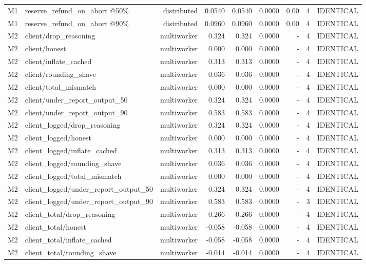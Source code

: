 \begin{table}[t]
{\begin{tabular}{llrrrrrrr}
M1 & reserve\_refund\_on\_abort @50\% & distributed & 0.0540 & 0.0540 & 0.0000 & 0.00 & 4 & IDENTICAL \\
M1 & reserve\_refund\_on\_abort @90\% & distributed & 0.0960 & 0.0960 & 0.0000 & 0.00 & 4 & IDENTICAL \\
M2 & client/drop\_reasoning & multiworker & 0.324 & 0.324 & 0.0000 & - & 4 & IDENTICAL \\
M2 & client/honest & multiworker & 0.000 & 0.000 & 0.0000 & - & 4 & IDENTICAL \\
M2 & client/inflate\_cached & multiworker & 0.313 & 0.313 & 0.0000 & - & 4 & IDENTICAL \\
M2 & client/rounding\_shave & multiworker & 0.036 & 0.036 & 0.0000 & - & 4 & IDENTICAL \\
M2 & client/total\_mismatch & multiworker & 0.000 & 0.000 & 0.0000 & - & 4 & IDENTICAL \\
M2 & client/under\_report\_output\_50 & multiworker & 0.324 & 0.324 & 0.0000 & - & 4 & IDENTICAL \\
M2 & client/under\_report\_output\_90 & multiworker & 0.583 & 0.583 & 0.0000 & - & 4 & IDENTICAL \\
M2 & client\_logged/drop\_reasoning & multiworker & 0.324 & 0.324 & 0.0000 & - & 4 & IDENTICAL \\
M2 & client\_logged/honest & multiworker & 0.000 & 0.000 & 0.0000 & - & 4 & IDENTICAL \\
M2 & client\_logged/inflate\_cached & multiworker & 0.313 & 0.313 & 0.0000 & - & 4 & IDENTICAL \\
M2 & client\_logged/rounding\_shave & multiworker & 0.036 & 0.036 & 0.0000 & - & 4 & IDENTICAL \\
M2 & client\_logged/total\_mismatch & multiworker & 0.000 & 0.000 & 0.0000 & - & 4 & IDENTICAL \\
M2 & client\_logged/under\_report\_output\_50 & multiworker & 0.324 & 0.324 & 0.0000 & - & 4 & IDENTICAL \\
M2 & client\_logged/under\_report\_output\_90 & multiworker & 0.583 & 0.583 & 0.0000 & - & 3 & IDENTICAL \\
M2 & client\_total/drop\_reasoning & multiworker & 0.266 & 0.266 & 0.0000 & - & 4 & IDENTICAL \\
M2 & client\_total/honest & multiworker & -0.058 & -0.058 & 0.0000 & - & 4 & IDENTICAL \\
M2 & client\_total/inflate\_cached & multiworker & -0.058 & -0.058 & 0.0000 & - & 4 & IDENTICAL \\
M2 & client\_total/rounding\_shave & multiworker & -0.014 & -0.014 & 0.0000 & - & 4 & IDENTICAL \\

\end{tabular}}
\end{table}
